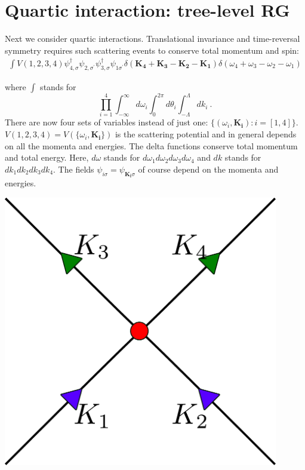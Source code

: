\documentclass[14pt]{extarticle}
\begin{document}
\section{Quartic interaction: tree-level RG}
Next we consider quartic interactions. Translational invariance and time-reversal symmetry requires such scattering events to conserve total momentum and spin:
\begin{equation}\begin{aligned}
	\int V(1,2,3,4)\psi_{4,\sigma}^\dagger\psi_{2,\sigma^\prime}\psi_{3,\sigma}^\dagger\psi_{1\sigma^\prime} \delta(\mathbf{K_4}+\mathbf{K_3} - \mathbf{K_2} - \mathbf{K_1})\delta({\omega_4}+{\omega_3} - {\omega_2} - {\omega_1})
\end{aligned}\end{equation}
\begin{minipage}{0.6\textwidth}
where \(\int\) stands for  \[\prod_{i=1}^4\int_{-\infty}^\infty d\omega_i \int_{0}^{2\pi}d\theta_i \int_{-\Lambda}^\Lambda dk_i~.\] There are now four sets of variables instead of just one: \(\{(\omega_i, \mathbf{K_i}) : i=[1,4]\}\). \(V(1,2,3,4) = V(\{\omega_i, \mathbf{K_i}\})\) is the scattering potential and in general depends on all the momenta and energies. The delta functions conserve total momentum and total energy. Here, \(d\omega\) stands for \(d\omega_1d\omega_2d\omega_3d\omega_4\) and \(dk\) stands for \(dk_1dk_2dk_3dk_4\). The fields \(\psi_{i\sigma} = \psi_{\mathbf{K_i}\sigma}\) of course depend on the momenta and energies. 
\end{minipage}
\hspace*{\fill}
\begin{minipage}{0.3\textwidth}
\begin{center}\includegraphics[width=0.9\textwidth]{./figures/term.pdf}\end{center}
\end{minipage}\\\\
\end{document}
